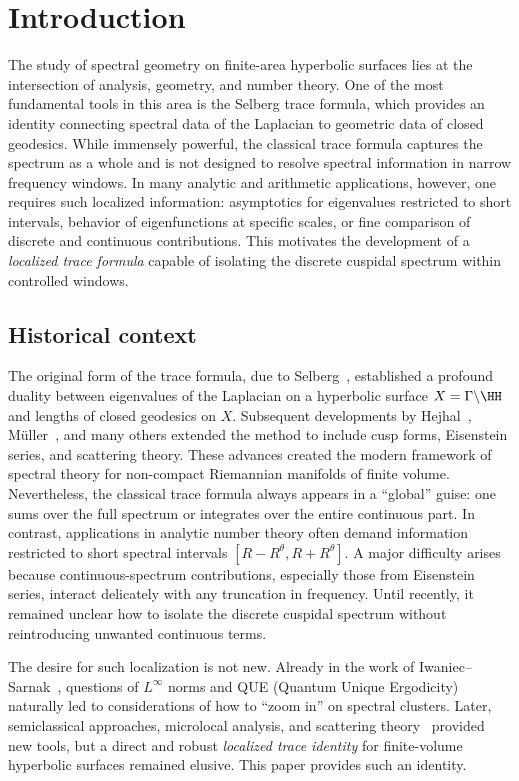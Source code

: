 \section{Introduction}\label{sec:intro}

The study of spectral geometry on finite-area hyperbolic surfaces lies at the intersection of analysis, geometry, and number theory. 
One of the most fundamental tools in this area is the Selberg trace formula, which provides an identity connecting spectral data of the Laplacian to geometric data of closed geodesics. 
While immensely powerful, the classical trace formula captures the spectrum as a whole and is not designed to resolve spectral information in narrow frequency windows. 
In many analytic and arithmetic applications, however, one requires such localized information: asymptotics for eigenvalues restricted to short intervals, behavior of eigenfunctions at specific scales, or fine comparison of discrete and continuous contributions. 
This motivates the development of a \emph{localized trace formula} capable of isolating the discrete cuspidal spectrum within controlled windows.

\subsection{Historical context}
The original form of the trace formula, due to Selberg~\cite{selberg1956}, established a profound duality between eigenvalues of the Laplacian on a hyperbolic surface $X=\Gamma\backslash\HH$ and lengths of closed geodesics on $X$. 
Subsequent developments by Hejhal~\cite{hejhal1976,hejhal1983}, M\"uller~\cite{mueller1983}, and many others extended the method to include cusp forms, Eisenstein series, and scattering theory. 
These advances created the modern framework of spectral theory for non-compact Riemannian manifolds of finite volume. 
Nevertheless, the classical trace formula always appears in a ``global'' guise: one sums over the full spectrum or integrates over the entire continuous part. 
In contrast, applications in analytic number theory often demand information restricted to short spectral intervals $[R-R^\theta,R+R^\theta]$. 
A major difficulty arises because continuous-spectrum contributions, especially those from Eisenstein series, interact delicately with any truncation in frequency. 
Until recently, it remained unclear how to isolate the discrete cuspidal spectrum without reintroducing unwanted continuous terms.

The desire for such localization is not new. 
Already in the work of Iwaniec–Sarnak~\cite{iwaniec1995}, questions of $L^\infty$ norms and QUE (Quantum Unique Ergodicity) naturally led to considerations of how to ``zoom in'' on spectral clusters. 
Later, semiclassical approaches, microlocal analysis, and scattering theory~\cite{zworski2012,dyatlovzworski2019} provided new tools, but a direct and robust \emph{localized trace identity} for finite-volume hyperbolic surfaces remained elusive. 
This paper provides such an identity.

